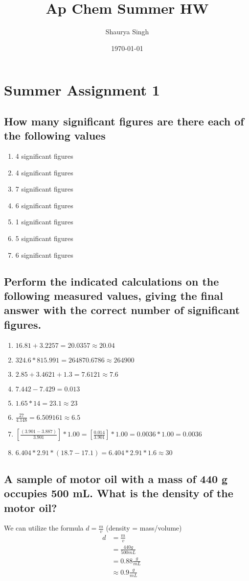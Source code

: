 \documentclass[11pt]{article}
\author{Shaurya Singh}
\date{\today}
\title{Ap Chem Summer HW}
\begin{document}
\maketitle

\section{Summer Assignment 1}
\label{sec:org560dc34}
\subsection{How many significant figures are there each of the following values}
\label{sec:org945ef9f}
\begin{enumerate}
\item 4 significant figures
\item 4 significant figures
\item 7 significant figures
\item 6 significant figures
\item 1 significant figures
\item 5 significant figures
\item 6 significant figures
\end{enumerate}

\subsection{Perform the indicated calculations on the following measured values, giving the final answer with the correct number of significant figures.}
\label{sec:org441ffd1}
\begin{enumerate}
\item \(16.81 + 3.2257 = 20.0357 \approx 20.04\)
\item \(324.6 * 815.991 = 264870.6786 \approx 264900\)
\item \(2.85 + 3.4621 + 1.3 = 7.6121 \approx 7.6\)
\item \(7.442 - 7.429 = 0.013\)
\item \(1.65 * 14 = 23.1 \approx 23\)
\item \(\frac{27}{4.148} = 6.509161 \approx 6.5\)
\item \([\frac{(3.901 - 3.887)}{3.901}] * 1.00 = [\frac{0.014}{3.901}] * 1.00 = 0.0036 * 1.00 = 0.0036\)
\item \(6.404 * 2.91 * (18.7 - 17.1) = 6.404 * 2.91 * 1.6 \approx 30\)
\end{enumerate}

\subsection{A sample of motor oil with a mass of 440 g occupies 500 mL. What is the density of the motor oil?}
\label{sec:orga4395e7}
We can utilize the formula \(d=\frac{m}{v}\) (density = mass/volume)
\begin{align}
d&=\frac{m}{v} &&\\\nonumber
            &=\frac{440g}{500mL}&&\\\nonumber
            &=0.88\frac{g}{mL}&&\\\nonumber
            &\approx0.9\frac{g}{mL}&&
\end{align}
\end{document}
